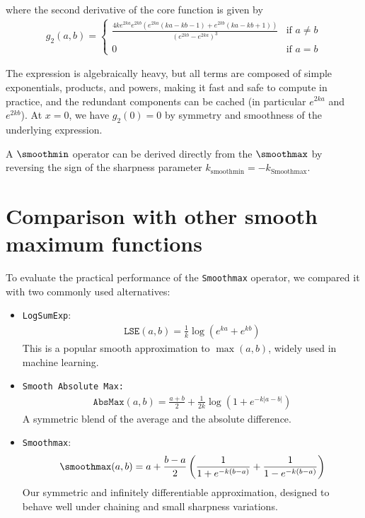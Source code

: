 where the second derivative of the core function is given by
\begin{align}
    g_2(a, b) = \begin{cases}
        \frac{4ke^{2ka}e^{2kb} \left( e^{2ka} (ka-kb-1) + e^{2kb}(ka - kb + 1) \right)}{\left(e^{2kb}-e^{2ka} \right)^3} &\text{if } a \neq b \\
        0  &\text{if } a = b
    \end{cases}
\end{align}

The expression is algebraically heavy, but all terms are composed of simple exponentials, products, and powers, making it fast and safe to compute in practice, and the redundant components can be cached (in particular $e^{2ka}$ and $e^{2kb}$). At $x = 0$, we have $g_2(0) = 0$ by symmetry and smoothness of the underlying expression.

A $\smoothmin$ operator can be derived directly from the $\smoothmax$ by reversing the sign of the sharpness parameter $k_{\text{smoothmin}} = - k_{\text{Smoothmax}}$.



\section{Comparison with other smooth maximum functions}
\label{sec:comparison-smoothmax}

To evaluate the practical performance of the \texttt{Smoothmax} operator, we compared it with two commonly used alternatives:

\begin{itemize}
    \item \texttt{LogSumExp}:
    \begin{align}
        \mathrm{\texttt{LSE}}(a, b) = \frac{1}{k} \log\left(e^{k a} + e^{k b}\right)
    \end{align}
    This is a popular smooth approximation to $\max(a, b)$, widely used in machine learning.

    \item \texttt{Smooth Absolute Max:}
    \begin{align}
        \mathrm{\texttt{AbsMax}}(a, b) = \frac{a + b}{2} + \frac{1}{2k} \log\left(1 + e^{-k|a - b|}\right)
    \end{align}
    A symmetric blend of the average and the absolute difference.

    \item \texttt{Smoothmax}:
    \begin{align}
        \smoothmax(a, b) = a + \frac{b - a}{2} \left( \frac{1}{1 + e^{-k(b - a)}} + \frac{1}{1 - e^{-k(b - a)}} \right)
    \end{align}
    Our symmetric and infinitely differentiable approximation, designed to behave well under chaining and small sharpness variations.
\end{itemize}

